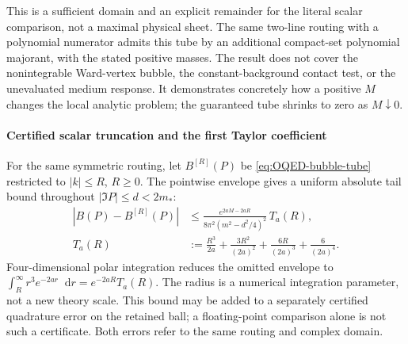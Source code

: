 \documentclass[final,5p,times,twocolumn,numbers,nopreprintline]{elsarticle}
\numberwithin{equation}{section}
\theoremstyle{definition}
\theoremstyle{remark}
\newcommand{\dd}{\mathop{}\!\mathrm d}
\begin{document}
This is a sufficient domain and an explicit remainder for the literal
scalar comparison, not a maximal physical sheet. The same two-line
routing with a polynomial numerator admits this tube by an additional
compact-set polynomial majorant, with the stated positive masses.
The result does not cover the nonintegrable Ward-vertex bubble, the
constant-background contact test, or the unevaluated medium response.
It demonstrates concretely how a positive \(M\) changes the local
analytic problem; the guaranteed tube shrinks to zero as \(M\downarrow0\).

\paragraph{Certified scalar truncation and the first Taylor coefficient}
For the same symmetric routing, let \(B^{[R]}(P)\) be
\eqref{eq:OQED-bubble-tube} restricted to \(|k|\leq R\), \(R\geq0\).
The pointwise envelope gives a uniform absolute tail bound throughout
\(|\Im P|\leq d<2m_*\):
\begin{equation}
\begin{aligned}
 |B(P)-B^{[R]}(P)|
 &\leq\frac{e^{2aM-2aR}}{8\pi^2(m^2-d^2/4)^2}\,T_a(R),\\
 T_a(R)&:=\frac{R^3}{2a}+\frac{3R^2}{(2a)^2}
                   +\frac{6R}{(2a)^3}+\frac6{(2a)^4}.
\end{aligned}
 \label{eq:OQED-bubble-radial-tail}
\end{equation}
Four-dimensional polar integration reduces the omitted envelope to
\(\int_R^\infty r^3e^{-2ar}\dd r=e^{-2aR}T_a(R)\).
The radius is a numerical integration parameter, not a new theory scale.
This bound may be added to a separately certified quadrature error on
the retained ball; a floating-point comparison alone is not such a
certificate. Both errors refer to the same routing and complex domain.
\end{document}
